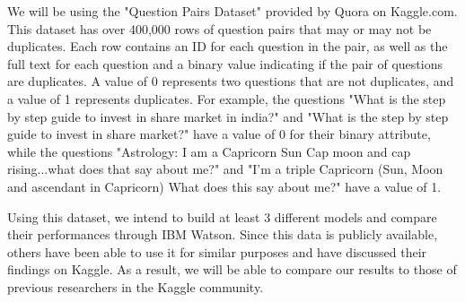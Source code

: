 \documentclass{sig-alternate}
\begin{document}
We will be using the "Question Pairs Dataset" provided by Quora on Kaggle.com.\cite{quora:kaggle} This dataset has over 400,000 rows of question pairs that may or may not be duplicates. Each row contains an ID for each question in the pair, as well as the full text for each question and a binary value indicating if the pair of questions are duplicates. A value of 0 represents two questions that are not duplicates, and a value of 1 represents duplicates. For example, the questions "What is the step by step guide to invest in share market in india?" and "What is the step by step guide to invest in share market?" have a value of 0 for their binary attribute, while the questions "Astrology: I am a Capricorn Sun Cap moon and cap rising...what does that say about me?" and "I'm a triple Capricorn (Sun, Moon and ascendant in Capricorn) What does this say about me?" have a value of 1.

Using this dataset, we intend to build at least 3 different models and compare their performances through IBM Watson. Since this data is publicly available, others have been able to use it for similar purposes and have discussed their findings on Kaggle. As a result, we will be able to compare our results to those of previous researchers in the Kaggle community.



\balance
\end{document}
